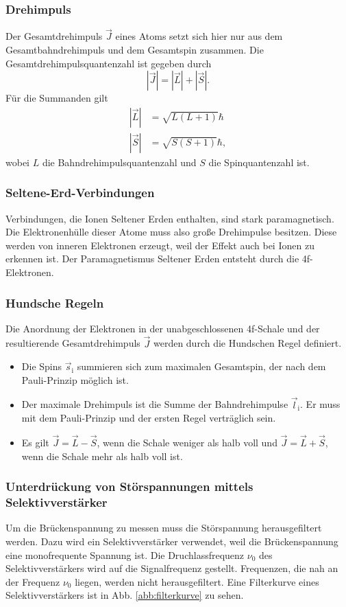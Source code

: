 \subsubsection{Drehimpuls}
Der Gesamtdrehimpuls $\vec{J}$ eines Atoms setzt sich hier nur aus dem Gesamtbahndrehimpuls und dem Gesamtspin 
zusammen. Die Gesamtdrehimpulsquantenzahl ist gegeben durch
\begin{equation*}
    |\vec{J}| = |\vec{L}| + |\vec{S}|.
\end{equation*}
Für die Summanden gilt
\begin{align*}
   |\vec{L}| &= \sqrt{L(L+1)} \hbar \\
   |\vec{S}| &= \sqrt{S(S+1)} \hbar,
\end{align*}
wobei $L$ die Bahndrehimpulsquantenzahl und $S$ die Spinquantenzahl ist.

\subsubsection{Seltene-Erd-Verbindungen}
Verbindungen, die Ionen Seltener Erden enthalten, sind stark paramagnetisch. 
Die Elektronenhülle dieser Atome muss also große Drehimpulse besitzen. 
Diese werden von inneren Elektronen erzeugt, weil der Effekt auch bei Ionen zu erkennen ist. 
Der Paramagnetismus Seltener Erden entsteht durch die 4f-Elektronen. %


\subsubsection{Hundsche Regeln}
Die Anordnung der Elektronen in der unabgeschlossenen 
4f-Schale und der resultierende Gesamtdrehimpuls $\vec{J}$ werden durch die Hundschen 
Regel definiert. 
\begin{itemize}
\item Die Spins $\vec{s}_\text{i}$ summieren sich zum maximalen Gesamtspin, der nach dem 
Pauli-Prinzip möglich ist.
\item Der maximale Drehimpuls ist die Summe der Bahndrehimpulse $\vec{l}_\text{i}$. Er 
muss mit dem Pauli-Prinzip und der ersten Regel verträglich sein. 
\item Es gilt $\vec{J}= \vec{L} - \vec{S}$, wenn die Schale weniger als halb voll und 
$\vec{J}= \vec{L} + \vec{S}$, wenn die Schale mehr als halb voll ist.
\end{itemize}

\subsubsection{Unterdrückung von Störspannungen mittels Selektivverstärker}
Um die Brückenspannung zu messen muss die Störspannung herausgefiltert werden. 
Dazu wird ein Selektivverstärker verwendet, weil
die Brückenspannung eine monofrequente Spannung ist. Die Druchlassfrequenz $\nu_0$ des 
Selektivverstärkers wird auf die Signalfrequenz gestellt. 
Frequenzen, die nah an der Frequenz $\nu_0$ liegen, werden nicht herausgefiltert.
Eine Filterkurve eines Selektivverstärkers ist in Abb. \ref{abb:filterkurve} zu sehen.

